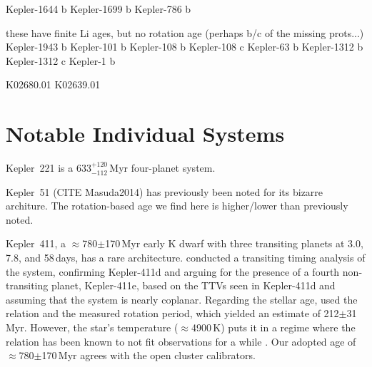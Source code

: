 \documentclass[11pt,twocolumn,tighten]{aastex63}
\begin{document}
Kepler-1644 b
Kepler-1699 b
 Kepler-786 b

these have finite Li ages, but no rotation age (perhaps b/c of the missing prots...)
Kepler-1943 b
 Kepler-101 b
 Kepler-108 b
 Kepler-108 c
  Kepler-63 b
Kepler-1312 b
Kepler-1312 c
   Kepler-1 b

K02680.01
K02639.01



\section{Notable Individual Systems}

Kepler~221 is a 633$^{+120}_{-112}$\,Myr four-planet system.

Kepler~51 (CITE Masuda2014) has previously been noted for its bizarre architure.
The rotation-based age we find here is higher/lower than previously noted.

Kepler~411, a $\approx$780$\pm$170\,Myr early K dwarf with three
transiting planets at 3.0, 7.8, and 58\,days, has a rare
architecture.  \citet{2019A&A...624A..15S} conducted a transiting
timing analysis of the system, confirming Kepler-411d and arguing for
the presence of a fourth non-transiting planet, Kepler-411e, based on
the TTVs seen in Kepler-411d and assuming that the system is nearly
coplanar.  Regarding the stellar age, \citet{2019A&A...624A..15S} used
the \citet{2007ApJ...669.1167B} relation and the measured rotation
period, which yielded an estimate of 212$\pm$31\,Myr.  However, the
star's temperature ($\approx$4900\,K) puts it in a regime where the
\citeauthor{2007ApJ...669.1167B} relation has been known to not fit
observations for a while
\citep[e.g.][Fig.~9]{2008ApJ...687.1264M}.  Our adopted age of
$\approx$780$\pm$170\,Myr agrees with the open cluster calibrators.

\end{document}
